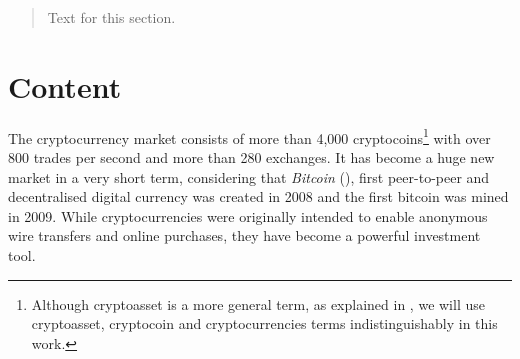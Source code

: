 \documentclass{bmcart}
\begin{document}
\begin{frontmatter}
\begin{abstractbox}
\begin{abstract}
Text for this section.
\end{abstract}


\begin{keyword}
\end{keyword}


\end{abstractbox}
%

\end{frontmatter}



\section*{Content}
The cryptocurrency market consists of more than 4,000 cryptocoins\footnote{Although cryptoasset is a more general term, as explained in \cite{CryptoAssetsChris2018}, we will use cryptoasset, cryptocoin and cryptocurrencies terms indistinguishably in this work.} with over 800 trades per second and more than 280 exchanges. It has become a huge new market in a very short term, considering that \textit{Bitcoin} (\cite{Nakamoto2008}), first peer-to-peer and decentralised digital currency was created in 2008 and the first bitcoin was mined in 2009. While cryptocurrencies were originally intended to enable anonymous wire transfers and online purchases, they have become a powerful investment tool.
\end{document}
